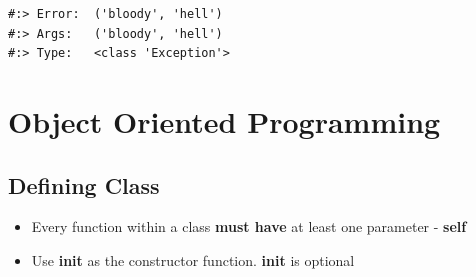 \documentclass[
]{book}
\providecommand{\tightlist}{%
  \setlength{\itemsep}{0pt}\setlength{\parskip}{0pt}}
\begin{document}
\begin{verbatim}
#:> Error:  ('bloody', 'hell') 
#:> Args:   ('bloody', 'hell') 
#:> Type:   <class 'Exception'>
\end{verbatim}

\hypertarget{object-oriented-programming}{%
\chapter{Object Oriented Programming}\label{object-oriented-programming}}

\hypertarget{defining-class}{%
\section{Defining Class}\label{defining-class}}

\begin{itemize}
\tightlist
\item
  Every function within a class \textbf{must have} at least one parameter - \textbf{self}\\
\item
  Use \textbf{init} as the constructor function. \textbf{init} is optional
\end{itemize}
\end{document}

